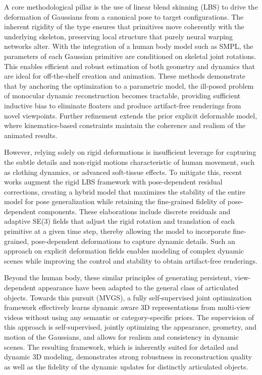 \documentclass[11pt,a4paper]{article}
\begin{document}
A core methodological pillar is the use of linear blend skinning (LBS) to drive the deformation of Gaussians from a canonical pose to target configurations. The inherent rigidity of the type ensures that primitives move coherently with the underlying skeleton, preserving local structure that purely neural warping networks alter. With the integration of a human body model such as SMPL, the parameters of each Gaussian primitive are conditioned on skeletal joint rotations. This enables efficient and robust estimation of both geometry and dynamics that are ideal for off-the-shelf creation and animation. These methods demonstrate that by anchoring the optimization to a parametric model, the ill-posed problem of monocular dynamic reconstruction becomes tractable, providing sufficient inductive bias to eliminate floaters and produce artifact-free renderings from novel viewpoints. Further refinement extends the prior explicit deformable model, where kinematics-based constraints maintain the coherence and realism of the animated results.

However, relying solely on rigid deformations is insufficient leverage for capturing the subtle details and non-rigid motions characteristic of human movement, such as clothing dynamics, or advanced soft-tissue effects. To mitigate this, recent works augment the rigid LBS framework with pose-dependent residual corrections, creating a hybrid model that maximizes the stability of the entire model for pose generalization while retaining the fine-grained fidelity of pose-dependent components. These elaborations include discrete residuals and adaptive SE(3) fields that adjust the rigid rotation and translation of each primitive at a given time step, thereby allowing the model to incorporate fine-grained, pose-dependent deformations to capture dynamic details. Such an approach on explicit deformation fields enables modeling of complex dynamic scenes while improving the control and stability to obtain artifact-free renderings.

Beyond the human body, these similar principles of generating persistent, view-dependent appearance have been adapted to the general class of articulated objects.
Towards this pursuit (MVGS), a fully self-supervised joint optimization framework effectively learns dynamic aware 3D representations from multi-view videos without using any semantic or category-specific priors. The supervision of this approach is self-supervised, jointly optimizing the appearance, geometry, and motion of the Gaussians, and allows for realism and consistency in dynamic scenes. The resulting framework, which is inherently suited for detailed and dynamic 3D modeling, demonstrates strong robustness in reconstruction quality as well as the fidelity of the dynamic updates for distinctly articulated objects.
\end{document}
